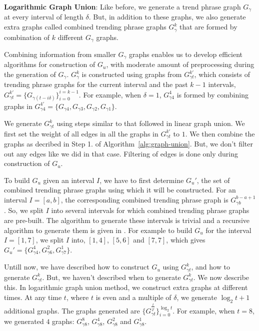 \documentclass{sig-alternate}
\begin{document}
\medskip\noindent\textbf{Logarithmic Graph Union}: Like before, we generate a trend phrase graph $G_\gamma$ at every interval of length $\delta$. But, in addition to these graphs, we also generate extra graphs called combined trending phrase graphs $G_{\gamma}^k$ that are formed by combination of $k$ different $G_\gamma$ graphs. 

Combining information from smaller $G_\gamma$ graphs enables us to develop efficient algorithms for construction of $G_u$, with moderate amount of preprocessing during the generation of $G_\gamma$. $G_{\gamma}^k$ is constructed using graphs from $G_{\gamma t}^{k'}$, which consists of trending phrase graphs for the current interval and the past $k-1$ intervals, $G_{\gamma t}^{k'} = \{G_{\gamma (t-i\delta)}\}_{i=0}^{i=k-1}$. For example, when $\delta=1$, $G_{\gamma 4}^4$ is formed by combining graphs in $G_{\gamma 4}^{4'} = \{ G_{\gamma 4}, G_{\gamma 3}, G_{\gamma 2}, G_{\gamma 1} \}$. 

We generate $G_{\gamma t}^k$ using steps similar to that followed in linear graph union. We first set the weight of all edges in  all the graphs in $G_{\gamma t}^{k'}$ to $1$. We then combine the graphs as decribed in Step 1. of Algorithm~\ref{alg:graph-union}. But, we don't filter out any edges like we did in that case. Filtering of edges is done only during construction of $G_u$.

To build $G_u$ given an interval $I$, we have to first determine $G_u'$, the set of combined trending phrase graphs using which it will be constructed. For an interval $I=[a,b]$, the corresponding combined trending phrase graph is $G_{\gamma b} ^{b-a+1}$. So, we split $I$ into several intervals for which combined trending phrase graphs are pre-built. The algorithm to generate these intervals is trivial and a recursive algorithm to generate them is given in \cite{Dubinko:2006:tags}. For example to build $G_u$ for the interval $I = [1,7]$, we split $I$ into, $[1,4]$, $[5,6]$ and $[7,7]$, which gives $G_u' = \{G_{\gamma 4}^4, G_{\gamma 6}^2, G_{\gamma 7}^1\}$.

Untill now, we have described how to construct $G_u$ using $G_{\gamma t}^k$, and how to generate $G_{\gamma t}^k$. But, we haven't described when to generate $G_{\gamma t}^k$. We now describe this. In logarithmic graph union method, we construct extra graphs at different times. At any time $t$, where $t$ is even and a multiple of $\delta$, we generate $\log_2{t}+1$ additional graphs. The graphs generated are $\{G_{\gamma t}^{\frac{t}{2^i}}\}_{i=0}^{\log_2{t}}$. For example, when $t = 8$, we generated $4$ graphs: $G_{\gamma 8}^{8}$, $G_{\gamma 8}^{4}$, $G_{\gamma 8}^{2}$ and $G_{\gamma 8}^{1}$. 
\end{document}
